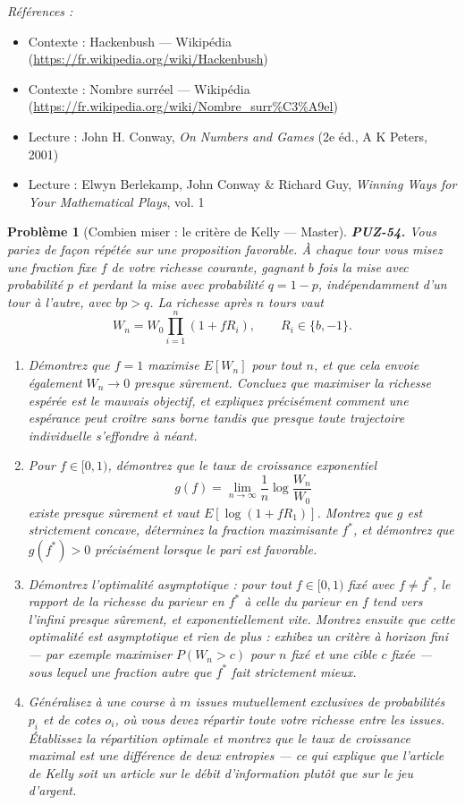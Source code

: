 \documentclass[11pt]{article}
\newtheorem{problem}{Problème}
\newenvironment{refs}{\par\small\noindent\emph{Références :}\begin{itemize}\setlength\itemsep{0pt}}{\end{itemize}\normalsize}
\begin{document}
\begin{refs}
\item Contexte : Hackenbush --- Wikipédia (\url{https://fr.wikipedia.org/wiki/Hackenbush})
\item Contexte : Nombre surréel --- Wikipédia (\url{https://fr.wikipedia.org/wiki/Nombre_surr%C3%A9el})
\item Lecture : John H. Conway, \textit{On Numbers and Games} (2e éd., A K Peters, 2001)
\item Lecture : Elwyn Berlekamp, John Conway \& Richard Guy, \textit{Winning Ways for Your Mathematical Plays}, vol. 1
\end{refs}

\bigskip

\begin{problem}[{Combien miser : le critère de Kelly --- Master}]
\textbf{PUZ-54.} Vous pariez de façon répétée sur une proposition favorable. À chaque tour
vous misez une fraction fixe $ f $ de votre richesse courante, gagnant $ b $ fois la mise
avec probabilité $ p $ et perdant la mise avec probabilité $ q = 1 - p $, indépendamment
d'un tour à l'autre, avec $ bp > q $. La richesse après $ n $ tours vaut
\[ W_n = W_0 \prod_{i=1}^{n} (1 + f R_i), \qquad R_i \in \{b, -1\} . \]
\begin{enumerate}
\item[(a)] Démontrez que $ f = 1 $ maximise $ E[W_n] $ pour tout $ n $, et que cela envoie
également $ W_n \to 0 $ presque sûrement. Concluez que maximiser la richesse espérée est
le mauvais objectif, et expliquez précisément comment une espérance peut croître sans borne
tandis que presque toute trajectoire individuelle s'effondre à néant.
\item[(b)] Pour $ f \in [0,1) $, démontrez que le taux de croissance exponentiel
\[ g(f) = \lim_{n \to \infty} \frac{1}{n} \log \frac{W_n}{W_0} \]
existe presque sûrement et vaut $ E[\log(1 + fR_1)] $. Montrez que $ g $ est strictement
concave, déterminez la fraction maximisante $ f^{*} $, et démontrez que
$ g(f^{*}) > 0 $ précisément lorsque le pari est favorable.
\item[(c)] Démontrez l'optimalité asymptotique : pour tout $ f \in [0,1) $ fixé avec
$ f \ne f^{*} $, le rapport de la richesse du parieur en $ f^{*} $ à celle du parieur en
$ f $ tend vers l'infini presque sûrement, et exponentiellement vite. Montrez ensuite que
cette optimalité est asymptotique et rien de plus : exhibez un critère à horizon fini --- par
exemple maximiser $ P(W_n > c) $ pour $ n $ fixé et une cible $ c $ fixée --- sous lequel
une fraction autre que $ f^{*} $ fait strictement mieux.
\item[(d)] Généralisez à une course à $ m $ issues mutuellement exclusives de probabilités
$ p_i $ et de cotes $ o_i $, où vous devez répartir toute votre richesse entre les issues.
Établissez la répartition optimale et montrez que le taux de croissance maximal est une
différence de deux entropies --- ce qui explique que l'article de Kelly soit un article sur le
débit d'information plutôt que sur le jeu d'argent.
\end{enumerate}

\end{problem}
\end{document}
